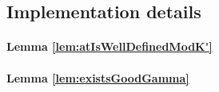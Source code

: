 \documentclass[a4paper,11pt]{amsart}
\begin{document}


\subsection{Implementation details}
\label{sec:gap_details}
\paragraph{Lemma \ref{lem:atIsWellDefinedModK'}}
\paragraph{Lemma \ref{lem:existsGoodGamma}}

{}

\appendix
% 
%
\end{document}
